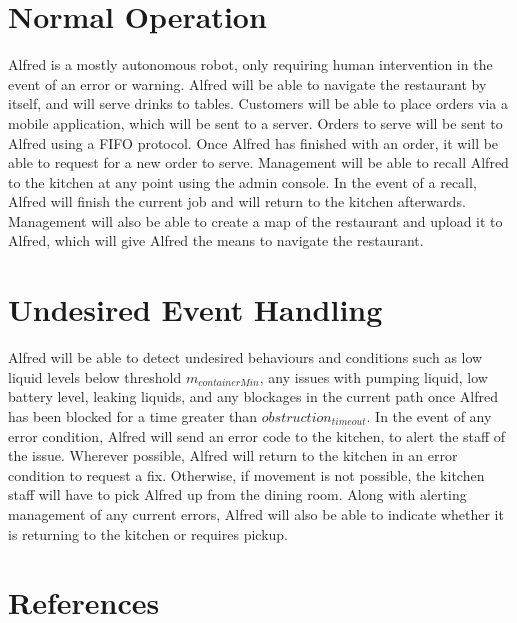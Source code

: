 \documentclass [10pt]{article}
\begin{document}
\section{Normal Operation}
Alfred is a mostly autonomous robot, only requiring human intervention in the event of an error or warning. Alfred will be able to navigate the restaurant by itself, and will serve drinks to tables. Customers will be able to place orders via a mobile application, which will be sent to a server. Orders to serve will be sent to Alfred using a FIFO protocol. Once Alfred has finished with an order, it will be able to request for a new order to serve. Management will be able to recall Alfred to the kitchen at any point using the admin console. In the event of a recall, Alfred will finish the current job and will return to the kitchen afterwards. Management will also be able to create a map of the restaurant and upload it to Alfred, which will give Alfred the means to navigate the restaurant.



\section{Undesired Event Handling}
Alfred will be able to detect undesired behaviours and conditions such as low liquid levels below threshold $ m_{containerMin} $, any issues with pumping liquid, low battery level, leaking liquids, and any blockages in the current path once Alfred has been blocked for a time greater than $ obstruction_{timeout} $. In the event of any error condition, Alfred will send an error code to the kitchen, to alert the staff of the issue. Wherever possible, Alfred will return to the kitchen in an error condition to request a fix. Otherwise, if movement is not possible, the kitchen staff will have to pick Alfred up from the dining room. Along with alerting management of any current errors, Alfred will also be able to indicate whether it is returning to the kitchen or requires pickup.

\section{References}
\end{document}
